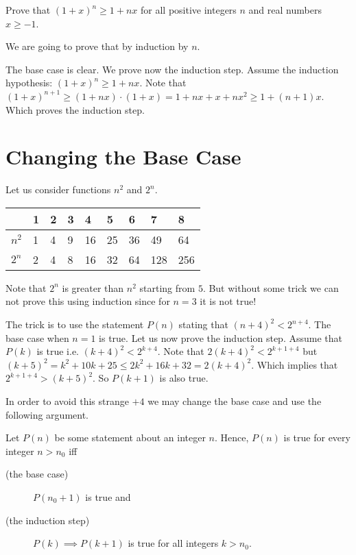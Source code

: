 \begin{exercise}
  Prove that $(1 + x)^n \ge 1 + nx$ for all positive integers $n$ and real
  numbers $x \ge -1$.
\end{exercise}
\begin{solution}
  We are going to prove that by induction by $n$.

  The base case is clear. We prove now the induction step. Assume the
  induction hypothesis: $(1 + x)^n \ge 1 + nx$. Note that  $(1 + x)^{n + 1} \ge
  (1 + nx) \cdot (1 + x) = 1 + nx + x + nx^2 \ge 1 + (n + 1)x$. Which proves the
  induction step.
\end{solution}

\section{Changing the Base Case}
Let us consider functions $n^2$ and $2^n$.

\begin{center}
    \begin{tabular}{l  l  l  l  l  l  l  l  l}
        \toprule
              & 1 & 2 & 3 & 4  & 5  & 6  & 7   & 8   \\
        \midrule
        $n^2$ & 1 & 4 & 9 & 16 & 25 & 36 & 49  & 64  \\
        $2^n$ & 2 & 4 & 8 & 16 & 32 & 64 & 128 & 256 \\
        \bottomrule
    \end{tabular}
\end{center}
Note that $2^n$ is greater than $n^2$ starting from $5$. But without some trick
we can not prove this using induction since for $n = 3$ it is not true!

The trick is to use the statement $P(n)$ stating that $(n + 4)^2 < 2^{n + 4}$.
The base case when $n = 1$ is true.
Let us now prove the induction step. Assume that $P(k)$ is true i.e.
$(k + 4)^2 < 2^{k + 4}$. Note that $2(k + 4)^2 < 2^{k + 1 + 4}$ but
$(k + 5)^2 = k^2 + 10k + 25 \le 2k^2 + 16k + 32 = 2(k + 4)^2$.
Which implies that
$2^{k + 1 + 4} > (k + 5)^2$. So $P(k + 1)$ is also true.

In order to avoid this strange $+4$ we may change the base
case and use the following argument.

\begin{theorem}
\label{theorem:induction-shifted-base}
    Let $P(n)$ be some statement about an integer $n$.
    Hence, $P(n)$ is true for every integer $n > n_0$ iff
    \begin{description}
        \item [(the base case)] $P(n_0 + 1)$ is true and
        \item [(the induction step)] $P(k) \implies P(k + 1)$ is true for all
            integers $k > n_0$.
    \end{description}
\end{theorem}

